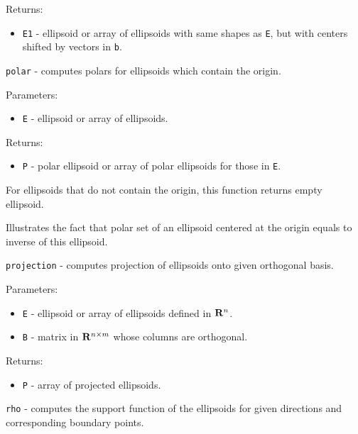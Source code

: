 \documentclass{report}
\begin{document}
Returns:
\begin{itemize}
\item {\tt E1} - ellipsoid or array of ellipsoids with same shapes as {\tt E},
but with centers shifted by vectors in {\tt b}.
\end{itemize}



\newpage

{\Large {\tt polar}} - computes polars for ellipsoids which contain the origin.

Parameters:
\begin{itemize}
\item {\tt E} - ellipsoid or array of ellipsoids.
\end{itemize}

Returns:
\begin{itemize}
\item {\tt P} - polar ellipsoid or array of polar ellipsoids for those
in {\tt E}.
\end{itemize}

For ellipsoids that do not contain the origin, this function returns empty
ellipsoid.

Illustrates the fact that polar set of an ellipsoid centered at the origin
equals to inverse of this ellipsoid.

\newpage

{\Large {\tt projection}} - computes projection of ellipsoids onto given
orthogonal basis.

Parameters:
\begin{itemize}
\item {\tt E} - ellipsoid or array of ellipsoids defined in ${\bf R}^n$.
\item {\tt B} - matrix in ${\bf R}^{n\times m}$ whose columns are orthogonal.
\end{itemize}

Returns:
\begin{itemize}
\item {\tt P} - array of projected ellipsoids.
\end{itemize}


\newpage

{\Large {\tt rho}} - computes the support function of the ellipsoids for
given directions and corresponding boundary points.
\end{document}
